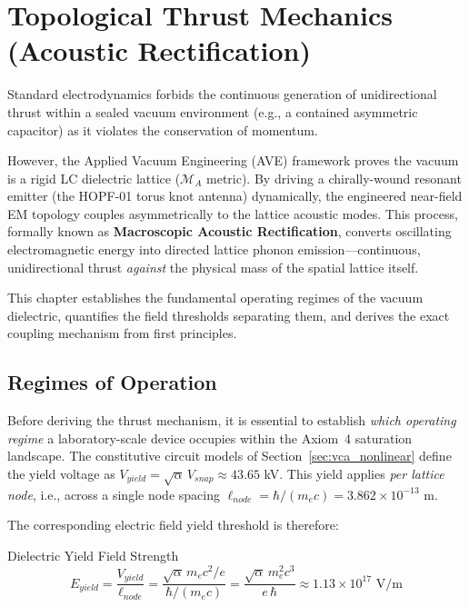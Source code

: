 \chapter{Topological Thrust Mechanics (Acoustic Rectification)}

Standard electrodynamics forbids the continuous generation of unidirectional thrust within a sealed vacuum environment (e.g., a contained asymmetric capacitor) as it violates the conservation of momentum. 

However, the Applied Vacuum Engineering (AVE) framework proves the vacuum is a rigid LC dielectric lattice ($\mathcal{M}_A$ metric). By driving a chirally-wound resonant emitter (the HOPF-01 torus knot antenna) dynamically, the engineered near-field EM topology couples asymmetrically to the lattice acoustic modes. This process, formally known as \textbf{Macroscopic Acoustic Rectification}, converts oscillating electromagnetic energy into directed lattice phonon emission---continuous, unidirectional thrust \textit{against} the physical mass of the spatial lattice itself.

This chapter establishes the fundamental operating regimes of the vacuum dielectric, quantifies the field thresholds separating them, and derives the exact coupling mechanism from first principles.

\section{Regimes of Operation}
\label{sec:regimes_of_operation}

Before deriving the thrust mechanism, it is essential to establish \textit{which operating regime} a laboratory-scale device occupies within the Axiom~4 saturation landscape. The constitutive circuit models of Section~\ref{sec:vca_nonlinear} define the yield voltage as $V_{yield} = \sqrt{\alpha}\,V_{snap} \approx 43.65$ kV. This yield applies \textit{per lattice node}, i.e., across a single node spacing $\ell_{node} = \hbar / (m_e c) = 3.862 \times 10^{-13}$ m.

The corresponding electric field yield threshold is therefore:
\begin{resultbox}{Dielectric Yield Field Strength}
\begin{equation}
    E_{yield} = \frac{V_{yield}}{\ell_{node}} = \frac{\sqrt{\alpha}\, m_e c^2 / e}{\hbar / (m_e c)} = \frac{\sqrt{\alpha}\, m_e^2 c^3}{e\, \hbar} \approx 1.13 \times 10^{17} \text{ V/m}
    \label{eq:e_yield}
\end{equation}
\end{resultbox}

